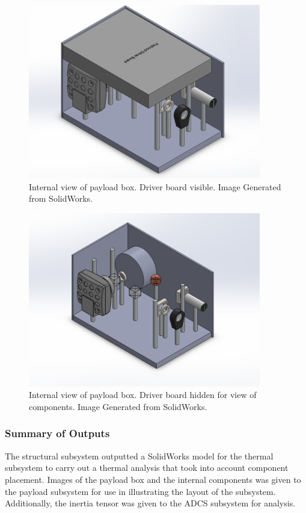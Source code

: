 \documentclass[12pt]{article}
\begin{document}
\begin{figure}[!ht]
\centering
\includegraphics[width=4in]{images/STR-10.png}
\caption{Internal view of payload box. Driver board visible. Image Generated from SolidWorks.}
\label{fig:str-10}
\end{figure}

\begin{figure}[!ht]
\centering
\includegraphics[width=4in]{images/STR-11.png}
\caption{Internal view of payload box. Driver board hidden for view of components. Image Generated from SolidWorks.}
\label{fig:str-11}
\end{figure}

\subsubsection{Summary of Outputs}
The structural subsystem outputted a SolidWorks model for the thermal subsystem to carry out a thermal analysis that took into account component placement.
Images of the payload box and the internal components was given to the payload subsystem for use in illustrating the layout of the subsystem.
Additionally, the inertia tensor was given to the ADCS subsystem for analysis.
\end{document}
